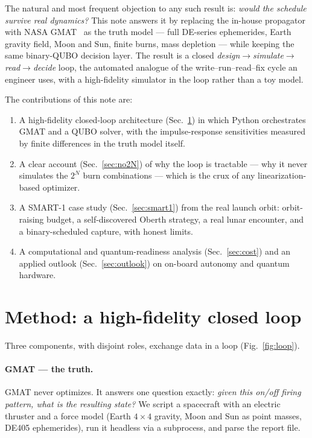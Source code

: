 \documentclass[11pt,a4paper]{article}
\theoremstyle{plain}
\begin{document}
The natural and most frequent objection to any such result is: \emph{would the
schedule survive real dynamics?} This note answers it by replacing the
in-house propagator with NASA GMAT~\cite{GMAT} as the truth model --- full
DE-series ephemerides, Earth gravity field, Moon and Sun, finite burns, mass
depletion --- while keeping the same binary-QUBO decision layer. The result is
a closed \emph{design$\rightarrow$simulate$\rightarrow$read$\rightarrow$decide}
loop, the automated analogue of the write--run--read--fix cycle an engineer
uses, with a high-fidelity simulator in the loop rather than a toy model.

The contributions of this note are:
\begin{enumerate}[leftmargin=1.5em, itemsep=2pt]
  \item A high-fidelity closed-loop architecture (Sec.~\ref{sec:method}) in
    which Python orchestrates GMAT and a QUBO solver, with the
    impulse-response sensitivities measured by finite differences in the
    truth model itself.
  \item A clear account (Sec.~\ref{sec:no2N}) of why the loop is tractable ---
    why it never simulates the $2^{N}$ burn combinations --- which is the
    crux of any linearization-based optimizer.
  \item A SMART-1 case study (Sec.~\ref{sec:smart1}) from the real launch
    orbit: orbit-raising budget, a self-discovered Oberth strategy, a real
    lunar encounter, and a binary-scheduled capture, with honest limits.
  \item A computational and quantum-readiness analysis (Sec.~\ref{sec:cost})
    and an applied outlook (Sec.~\ref{sec:outlook}) on on-board autonomy and
    quantum hardware.
\end{enumerate}

\section{Method: a high-fidelity closed loop}\label{sec:method}
Three components, with disjoint roles, exchange data in a loop
(Fig.~\ref{fig:loop}).

\paragraph{GMAT --- the truth.} GMAT never optimizes. It answers one question
exactly: \emph{given this on/off firing pattern, what is the resulting state?}
We script a spacecraft with an electric thruster and a force model (Earth
$4\times4$ gravity, Moon and Sun as point masses, DE405 ephemerides), run it
headless via a subprocess, and parse the report file.
\end{document}

